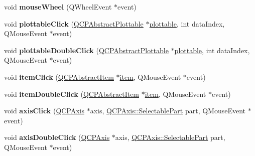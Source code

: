 \begin{DoxyCompactItemize}
\item 
\mbox{\label{class_q_custom_plot_ac80a14206f99304a91d2aa55775ec3ff}} 
void {\bfseries mouse\+Wheel} (Q\+Wheel\+Event $\ast$event)
\item 
\mbox{\label{class_q_custom_plot_af5fe78b8bc9e4e96df921612837fd4fd}} 
void {\bfseries plottable\+Click} (\hyperlink{class_q_c_p_abstract_plottable}{Q\+C\+P\+Abstract\+Plottable} $\ast$\hyperlink{class_q_custom_plot_a32de81ff53e263e785b83b52ecd99d6f}{plottable}, int data\+Index, Q\+Mouse\+Event $\ast$event)
\item 
\mbox{\label{class_q_custom_plot_a86a3ab7263c9c4e008e70d6c5fce9fbd}} 
void {\bfseries plottable\+Double\+Click} (\hyperlink{class_q_c_p_abstract_plottable}{Q\+C\+P\+Abstract\+Plottable} $\ast$\hyperlink{class_q_custom_plot_a32de81ff53e263e785b83b52ecd99d6f}{plottable}, int data\+Index, Q\+Mouse\+Event $\ast$event)
\item 
\mbox{\label{class_q_custom_plot_ae16b51f52d2b7aebbc7e3e74e6ff2e4b}} 
void {\bfseries item\+Click} (\hyperlink{class_q_c_p_abstract_item}{Q\+C\+P\+Abstract\+Item} $\ast$\hyperlink{class_q_custom_plot_ac042f2e78edd228ccf2f26b7fe215239}{item}, Q\+Mouse\+Event $\ast$event)
\item 
\mbox{\label{class_q_custom_plot_ac83aa9f5a3e9bb3efc9cdc763dcd42a6}} 
void {\bfseries item\+Double\+Click} (\hyperlink{class_q_c_p_abstract_item}{Q\+C\+P\+Abstract\+Item} $\ast$\hyperlink{class_q_custom_plot_ac042f2e78edd228ccf2f26b7fe215239}{item}, Q\+Mouse\+Event $\ast$event)
\item 
\mbox{\label{class_q_custom_plot_abf635f8b56ab5c16d5de9f358543e82b}} 
void {\bfseries axis\+Click} (\hyperlink{class_q_c_p_axis}{Q\+C\+P\+Axis} $\ast$axis, \hyperlink{class_q_c_p_axis_abee4c7a54c468b1385dfce2c898b115f}{Q\+C\+P\+Axis\+::\+Selectable\+Part} part, Q\+Mouse\+Event $\ast$event)
\item 
\mbox{\label{class_q_custom_plot_a6df35357460181a72da3e93d600f5256}} 
void {\bfseries axis\+Double\+Click} (\hyperlink{class_q_c_p_axis}{Q\+C\+P\+Axis} $\ast$axis, \hyperlink{class_q_c_p_axis_abee4c7a54c468b1385dfce2c898b115f}{Q\+C\+P\+Axis\+::\+Selectable\+Part} part, Q\+Mouse\+Event $\ast$event)

\end{DoxyCompactItemize}
